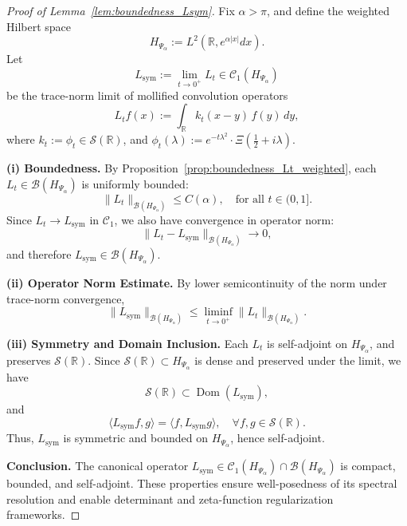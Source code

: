 \begin{proof}[Proof of Lemma~\ref{lem:boundedness_Lsym}]
Fix \( \alpha > \pi \), and define the weighted Hilbert space
\[
H_{\Psi_\alpha} := L^2(\mathbb{R}, e^{\alpha |x|} dx).
\]
Let
\[
L_{\mathrm{sym}} := \lim_{t \to 0^+} L_t \in \mathcal{C}_1(H_{\Psi_\alpha})
\]
be the trace-norm limit of mollified convolution operators
\[
L_t f(x) := \int_{\mathbb{R}} k_t(x - y)\, f(y)\, dy,
\]
where \( k_t := \widehat{\phi_t} \in \mathcal{S}(\mathbb{R}) \), and \( \phi_t(\lambda) := e^{-t\lambda^2} \cdot \Xi\left( \tfrac{1}{2} + i\lambda \right) \).

\medskip
\noindent\textbf{(i) Boundedness.}
By Proposition~\ref{prop:boundedness_Lt_weighted}, each \( L_t \in \mathcal{B}(H_{\Psi_\alpha}) \) is uniformly bounded:
\[
\| L_t \|_{\mathcal{B}(H_{\Psi_\alpha})} \le C(\alpha), \quad \text{for all } t \in (0,1].
\]
Since \( L_t \to L_{\mathrm{sym}} \) in \( \mathcal{C}_1 \), we also have convergence in operator norm:
\[
\| L_t - L_{\mathrm{sym}} \|_{\mathcal{B}(H_{\Psi_\alpha})} \to 0,
\]
and therefore \( L_{\mathrm{sym}} \in \mathcal{B}(H_{\Psi_\alpha}) \).

\medskip
\noindent\textbf{(ii) Operator Norm Estimate.}
By lower semicontinuity of the norm under trace-norm convergence,
\[
\| L_{\mathrm{sym}} \|_{\mathcal{B}(H_{\Psi_\alpha})} \le \liminf_{t \to 0^+} \| L_t \|_{\mathcal{B}(H_{\Psi_\alpha})}.
\]

\medskip
\noindent\textbf{(iii) Symmetry and Domain Inclusion.}
Each \( L_t \) is self-adjoint on \( H_{\Psi_\alpha} \), and preserves \( \mathcal{S}(\mathbb{R}) \). Since \( \mathcal{S}(\mathbb{R}) \subset H_{\Psi_\alpha} \) is dense and preserved under the limit, we have
\[
\mathcal{S}(\mathbb{R}) \subset \operatorname{Dom}(L_{\mathrm{sym}}),
\]
and
\[
\langle L_{\mathrm{sym}} f, g \rangle = \langle f, L_{\mathrm{sym}} g \rangle, \quad \forall f, g \in \mathcal{S}(\mathbb{R}).
\]
Thus, \( L_{\mathrm{sym}} \) is symmetric and bounded on \( H_{\Psi_\alpha} \), hence self-adjoint.

\medskip
\noindent\textbf{Conclusion.}
The canonical operator \( L_{\mathrm{sym}} \in \mathcal{C}_1(H_{\Psi_\alpha}) \cap \mathcal{B}(H_{\Psi_\alpha}) \) is compact, bounded, and self-adjoint. These properties ensure well-posedness of its spectral resolution and enable determinant and zeta-function regularization frameworks.
\end{proof}
